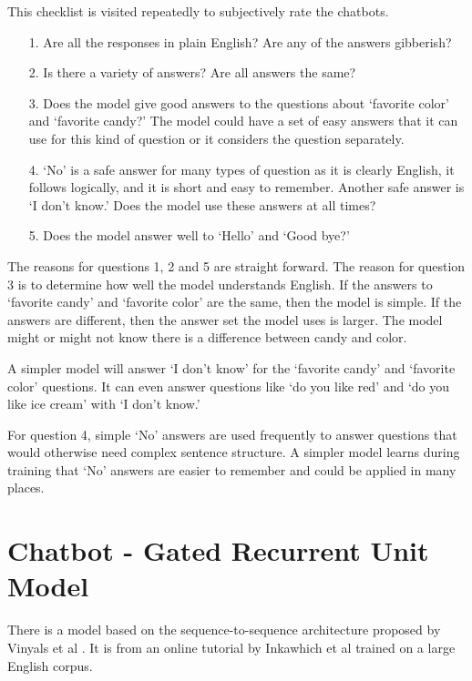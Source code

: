 This checklist is visited repeatedly to subjectively rate the chatbots.

\begin{itemize}
	
	\item [1.] Are all the responses in plain English? Are any of the answers gibberish?
	
	\item [2.] Is there a  variety of answers? Are all answers the same?
	
	\item [3.] Does the model give good answers to the questions about `favorite color' and `favorite candy?' The model could have a set of easy answers that it can use for this kind of question or it considers the question separately. 
	
	\item [4.] `No' is a safe answer for many types of question as it is clearly English, it follows logically, and it is short and easy to remember. Another safe answer is `I don't know.' Does the model use these answers at all times?
	
	\item [5.] Does the model answer well to `Hello' and `Good bye?'
	
\end{itemize}

The reasons for questions 1, 2 and 5 are straight forward. The reason for question 3 is to determine how well the model understands English. If the answers to `favorite candy' and `favorite color' are the same, then the model is simple. If the answers are different, then the answer set the model uses is larger. The model might or might not know there is a difference between candy and color. 

A simpler model will answer `I don't know' for the `favorite candy' and `favorite color' questions. It can even answer questions like `do you like red' and `do you like ice cream' with `I don't know.' 

For question 4, simple `No' answers are used frequently to answer questions that would otherwise need complex sentence structure. A simpler model learns during training that `No' answers are easier to remember and could be applied in many places.

\section{Chatbot - Gated Recurrent Unit Model}
There is a model based on the sequence-to-sequence architecture proposed by Vinyals et al \cite{DBLP:journals/corr/VinyalsL15}.
It is from an online tutorial by  Inkawhich et al \cite{2018Inkawhich} trained on a large English corpus. 

